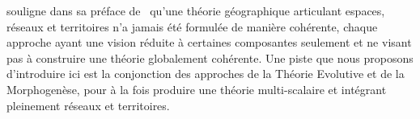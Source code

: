 % 
% 
%
%



 souligne dans sa préface de~\cite{offner1996reseaux} qu'une théorie géographique articulant espaces, réseaux et territoires n'a jamais été formulée de manière cohérente, chaque approche ayant une vision réduite à certaines composantes seulement et ne visant pas à construire une théorie globalement cohérente. Une piste que nous proposons d'introduire ici est la conjonction des approches de la Théorie Evolutive et de la Morphogenèse, pour à la fois produire une théorie multi-scalaire et intégrant pleinement réseaux et territoires.





